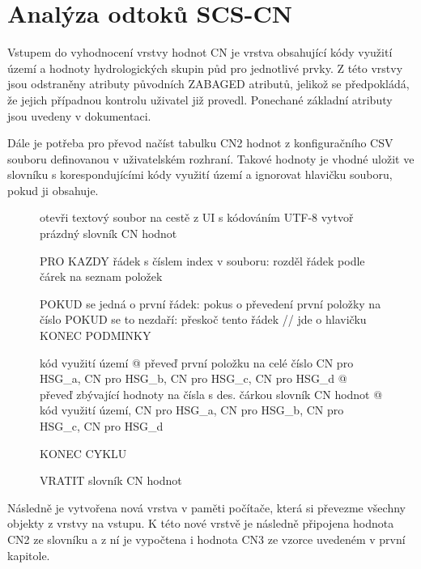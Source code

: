 \documentclass[a4paper,oneside,12pt]{book}
\begin{document}
\section{Analýza odtoků SCS-CN} \label{CN}
\hspace{10mm}Vstupem do vyhodnocení vrstvy hodnot CN je vrstva obsahující kódy využití území a hodnoty hydrologických skupin půd pro jednotlivé prvky. Z této vrstvy jsou odstraněny atributy původních ZABAGED atributů, jelikož se předpokládá, že jejich případnou kontrolu uživatel již provedl. Ponechané základní atributy jsou uvedeny v dokumentaci.

\hspace{10mm} Dále je potřeba pro převod načíst tabulku CN2 hodnot z konfiguračního CSV souboru definovanou v uživatelském rozhraní. Takové hodnoty je vhodné uložit ve slovníku s korespondujícími kódy využití území a ignorovat hlavičku souboru, pokud ji obsahuje.  \newline

\begin{figure}[H]
\begin{pseudocode}[style=mypseudocode, caption={Vytvoření slovníku z CSV souboru},label={kod:cncsv}]
otevři textový soubor na cestě z UI s kódováním UTF-8
vytvoř prázdný slovník CN hodnot

PRO KAZDY řádek s číslem index v souboru:
    rozděl řádek podle čárek na seznam položek

    POKUD se jedná o první řádek:
        pokus o převedení první položky na číslo
        POKUD se to nezdaří:
            přeskoč tento řádek  // jde o hlavičku
    KONEC PODMINKY

    kód využití území @ převeď první položku na celé číslo 
    CN pro HSG_a, CN pro HSG_b, CN pro HSG_c, CN pro HSG_d @ převeď zbývající hodnoty na čísla s des. čárkou
    slovník CN hodnot @ kód využití území, CN pro HSG_a, CN pro HSG_b, CN pro HSG_c, CN pro HSG_d

KONEC CYKLU

VRATIT slovník CN hodnot
\end{pseudocode}
\end{figure}

\hspace{10mm}Následně je vytvořena nová vrstva v paměti počítače, která si převezme všechny objekty z vrstvy na vstupu. K této nové vrstvě je následně připojena hodnota CN2 ze slovníku a z ní je vypočtena i hodnota CN3 ze vzorce uvedeném v první kapitole.
\end{document}
